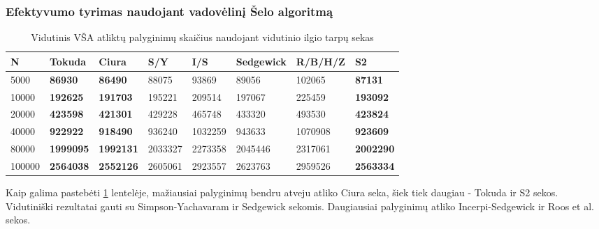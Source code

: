 \documentclass{VUMIFInfKursinis}
\begin{document}
\subsubsection{Efektyvumo tyrimas naudojant vadovėlinį Šelo algoritmą}

\begin{table}[H]
  \caption{Vidutinis VŠA atliktų palyginimų skaičius naudojant vidutinio ilgio tarpų sekas}
  \label{tss_medium_comparisons}
  \begin{tabular}{|l|l|l|l|l|l|l|l|}
  \hline
  N      & Tokuda           & Ciura            & S/Y     & I/S     & Sedgewick & R/B/H/Z & S2               \\ \hline
  5000   & \textbf{86930}   & \textbf{86490}   & 88075   & 93869   & 89056     & 102065  & \textbf{87131}   \\ \hline
  10000  & \textbf{192625}  & \textbf{191703}  & 195221  & 209514  & 197067    & 225459  & \textbf{193092}  \\ \hline
  20000  & \textbf{423598}  & \textbf{421301}  & 429228  & 465748  & 433320    & 493530  & \textbf{423824}  \\ \hline
  40000  & \textbf{922922}  & \textbf{918490}  & 936240  & 1032259 & 943633    & 1070908 & \textbf{923609}  \\ \hline
  80000  & \textbf{1999095} & \textbf{1992131} & 2033327 & 2273358 & 2045446   & 2317061 & \textbf{2002290} \\ \hline
  100000 & \textbf{2564038} & \textbf{2552126} & 2605061 & 2923557 & 2623763   & 2959526 & \textbf{2563334} \\ \hline
  \end{tabular}
\end{table}

Kaip galima pastebėti \ref{tss_medium_comparisons} lentelėje, mažiausiai palyginimų bendru atveju atliko Ciura seka,
šiek tiek daugiau - Tokuda ir S2 sekos.
Vidutiniški rezultatai gauti su Simpson-Yachavaram ir Sedgewick sekomis.
Daugiausiai palyginimų atliko Incerpi-Sedgewick ir Roos et al. sekos.
\end{document}
